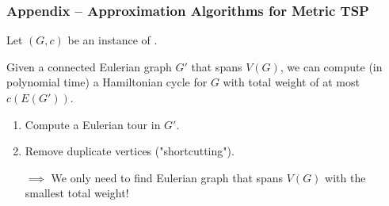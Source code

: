 \documentclass{beamer} %
\newenvironment{proofIdea}{%
  \renewcommand{\proofname}{Proof Idea}\renewcommand{\qedsymbol}{}\proof}{\endproof}
\begin{document}
\begin{frame}
  \frametitle{Appendix -- Approximation Algorithms for Metric TSP}

  Let $(G,c)$ be an instance of \mTSP{}.

  \begin{lemma}
    Given a connected Eulerian graph $G'$ that spans $V(G)$, we can compute (in polynomial time) a Hamiltonian cycle for $G$ with total weight of at most $c(E(G'))$.
  \end{lemma}
  \begin{proofIdea}
    \begin{enumerate}
      \item Compute a Eulerian tour in $G'$.
      \item Remove duplicate vertices ("shortcutting").
    \end{enumerate}
  \end{proofIdea}

  \begin{itemize}
    \item[$\implies$] We only need to find Eulerian graph that spans $V(G)$ with the smallest total weight!
  \end{itemize}
\end{frame}
\end{document}
